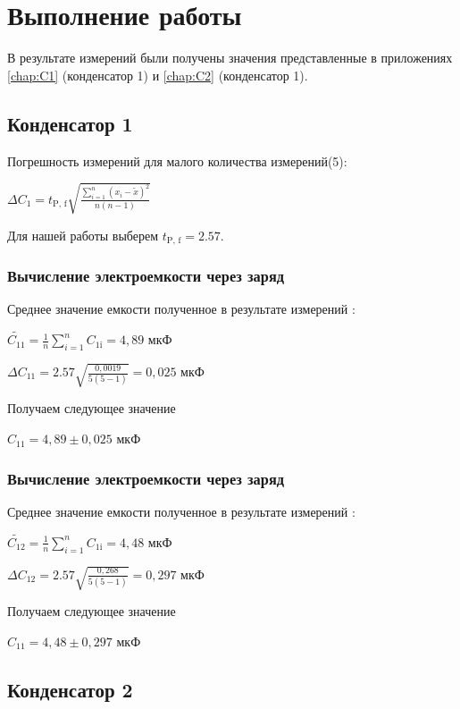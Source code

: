 \documentclass[14pt, a4paper, twoside]{extreport}
\begin{document}
\chapter{Выполнение работы}

В результате измерений были получены значения представленные в приложениях \ref{chap:C1} (конденсатор 1) и \ref{chap:C2} (конденсатор 1).

\section{Конденсатор 1}
Погрешность измерений для малого количества измерений(5):

$\Delta C_1 = t_\text{P, f} \sqrt{\frac{\sum_{i=1}^{n} (x_i - \tilde{x})^2}{n(n-1)}}$

Для нашей работы выберем $t_\text{P, f} = 2.57 $.

\subsection{Вычисление электроемкости через заряд }
Среднее значение емкости полученное в результате измерений :

$ \tilde{C_{11}} = \frac{1}{n}\sum_{i=1}^{n} C_\text{1i} = 4,89 \text{ мкФ} $

$\Delta C_{11} = 2.57 \sqrt{\frac{0,0019}{5(5-1)}} = 0,025 \text{ мкФ}$

Получаем следующее значение
\begin{center}
  $C_{11} = 4,89 \pm 0,025 \text{ мкФ}$
\end{center}

\subsection{Вычисление электроемкости через заряд }

Среднее значение емкости полученное в результате измерений :

$ \tilde{C_{12}} = \frac{1}{n}\sum_{i=1}^{n} C_\text{1i} = 4,48 \text{ мкФ} $

$\Delta C_{12} = 2.57 \sqrt{\frac{0,268}{5(5-1)}} = 0,297 \text{ мкФ}$

Получаем следующее значение
\begin{center}
  $C_{11} = 4,48 \pm 0,297 \text{ мкФ}$
\end{center}
\section{Конденсатор 2}
\end{document}

